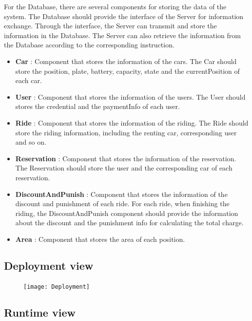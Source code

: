 \documentclass{article}
\begin{document}
	For the Database, there are several components for storing the data of the system. The Database should provide the interface of the Server for information exchange. Through the interface, the Server can transmit and  store the information in the Database. The Server can also retrieve the information from the Database according to the corresponding instruction.

	\begin{itemize}
		\item \textbf{Car} : Component that stores the information of the cars. The Car should store the position, plate, battery, capacity, state and the currentPosition of each car.
		\item \textbf{User} : Component that stores the information of the users. The User should stores the credential and the paymentInfo of each user.
		\item \textbf{Ride} : Component that stores the information of the riding. The Ride should store the riding information, including the renting car, corresponding user and so on.
		\item \textbf{Reservation} : Component that stores the information of the reservation. The Reservation should store the user and the corresponding car of each reservation.
		\item \textbf{DiscountAndPunish} : Component that stores the information of the discount and punishment of each ride. For each ride, when finishing the riding, the DiscountAndPunish component should provide the information about the discount and the punishment info for calculating the total charge.
		\item \textbf{Area} : Component that stores the area of each position.
	\end{itemize}
	\newpage

	\subsection{Deployment view}
	\begin{figure}[h]
		\texttt{[image: Deployment]}
	\end{figure}
	\newpage
	\subsection{Runtime view}
\end{document}
